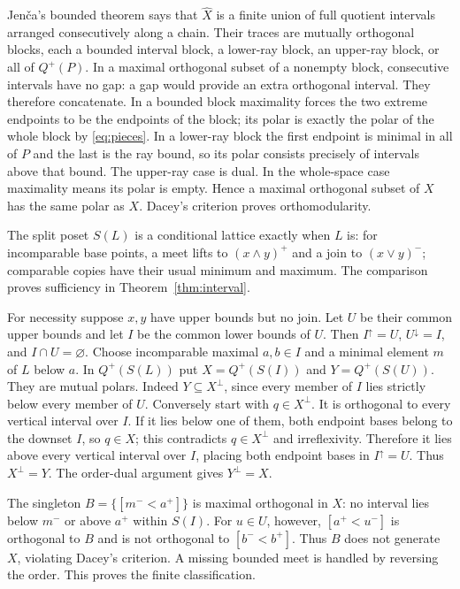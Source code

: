 \documentclass[11pt,a4paper]{article}
\theoremstyle{definition}
\begin{document}
Jen\v ca's bounded theorem says that $\widehat X$ is a finite union of full quotient intervals arranged consecutively along a chain. Their traces are mutually orthogonal blocks, each a bounded interval block, a lower-ray block, an upper-ray block, or all of $Q^+(P)$. In a maximal orthogonal subset of a nonempty block, consecutive intervals have no gap: a gap would provide an extra orthogonal interval. They therefore concatenate. In a bounded block maximality forces the two extreme endpoints to be the endpoints of the block; its polar is exactly the polar of the whole block by \eqref{eq:pieces}. In a lower-ray block the first endpoint is minimal in all of $P$ and the last is the ray bound, so its polar consists precisely of intervals above that bound. The upper-ray case is dual. In the whole-space case maximality means its polar is empty. Hence a maximal orthogonal subset of $X$ has the same polar as $X$. Dacey's criterion proves orthomodularity.

The split poset $S(L)$ is a conditional lattice exactly when $L$ is: for incomparable base points, a meet lifts to $(x\wedge y)^+$ and a join to $(x\vee y)^-$; comparable copies have their usual minimum and maximum. The comparison proves sufficiency in Theorem~\ref{thm:interval}.

For necessity suppose $x,y$ have upper bounds but no join. Let $U$ be their common upper bounds and let $I$ be the common lower bounds of $U$. Then $I^\uparrow=U$, $U^\downarrow=I$, and $I\cap U=\varnothing$. Choose incomparable maximal $a,b\in I$ and a minimal element $m$ of $L$ below $a$. In $Q^+(S(L))$ put $X=Q^+(S(I))$ and $Y=Q^+(S(U))$. They are mutual polars. Indeed $Y\subseteq X^\perp$, since every member of $I$ lies strictly below every member of $U$. Conversely start with $q\in X^\perp$. It is orthogonal to every vertical interval over $I$. If it lies below one of them, both endpoint bases belong to the downset $I$, so $q\in X$; this contradicts $q\in X^\perp$ and irreflexivity. Therefore it lies above every vertical interval over $I$, placing both endpoint bases in $I^\uparrow=U$. Thus $X^\perp=Y$. The order-dual argument gives $Y^\perp=X$.

The singleton $B=\{[m^-<a^+]\}$ is maximal orthogonal in $X$: no interval lies below $m^-$ or above $a^+$ within $S(I)$. For $u\in U$, however, $[a^+<u^-]$ is orthogonal to $B$ and is not orthogonal to $[b^-<b^+]$. Thus $B$ does not generate $X$, violating Dacey's criterion. A missing bounded meet is handled by reversing the order. This proves the finite classification.
\end{document}
